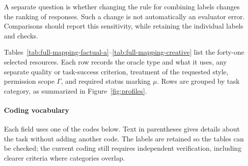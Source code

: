 \documentclass{clv2025}
\begin{document}
A separate question is whether changing the rule for combining labels changes
the ranking of responses. Such a change is not automatically an evaluator
error. Comparisons should report this sensitivity, while retaining the
individual labels and checks.

%
\makeatletter\def\@currentlabel{B}\makeatother\label{app:mapping}
\renewcommand*{\theHtable}{B.\arabic{table}}

Tables~\ref{tab:full-mapping-factual-a}--\ref{tab:full-mapping-creative} list
the forty-one selected resources. Each row records the oracle type and what
it uses, any separate quality or task-success criterion, treatment of the
requested style, permission scope $\Gamma$, and required status marking $\mu$.
Rows are grouped by task category, as summarized in Figure~\ref{fig:profiles}.

\paragraph{Coding vocabulary}
Each field uses one of the codes below. Text in parentheses gives details
about the task without adding another code. The labels are retained so the
tables can be checked; the current coding still requires independent
verification, including clearer criteria where categories overlap.
\end{document}
